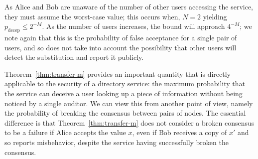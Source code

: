 \documentclass[USenglish]{llncs}
\begin{document}
As Alice and Bob are unaware of the number of other users accessing the service,
they must assume the worst-case value; this occurs when, $N=2$ yielding
$p_\mathrm{decep} \le 2^{-M}$.  As the number of users increases,
the bound will approach $4^{-M}$; we note again that this is the probability of
false acceptance for a single pair of users, and so does not take into
account the possibility that other users will detect the substitution and
report it publicly.

Theorem~\ref{thm:transfer-m} provides an important quantity that is directly
applicable to the security of a directory service: the maximum probability that
the service can deceive a user looking up a piece of information without being
noticed by a single auditor.  We can view this from another point of view,
namely the probability of breaking the consensus between pairs of nodes.
The essential difference is that Theorem~\ref{thm:transfer-m} does not
consider a broken consensus to be a failure if Alice accepts the value $x$, even
if Bob receives a copy of $x'$ and so reports misbehavior, despite the service having
successfully broken the consensus.
\end{document}
